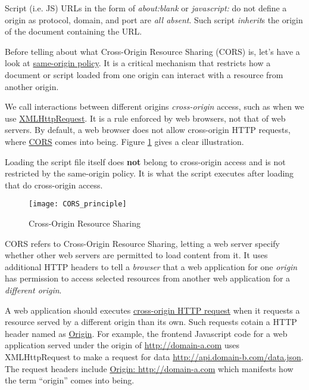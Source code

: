 Script (i.e. JS) URLs in the form of \textit{about:blank} or
\textit{javascript:} do not define a origin as protocol, domain,
and port are \textit{all absent}. Such script \textit{inherit}s
the origin of the document containing the URL.

Before telling about what Cross-Origin Resource Sharing (CORS) is,
let's have a look at
\href{https://developer.mozilla.org/en-US/docs/Web/Security/Same-origin_policy}{same-origin
  policy}. It is a critical mechanism that restricts how a
document or script loaded from one origin can interact with a
resource from another origin.

We call interactions between different origins
\textit{cross-origin} access, such as when we use
\href{https://developer.mozilla.org/en-US/docs/Web/API/XMLHttpRequest}{XMLHttpRequest}. It
is a rule enforced by web browsers, not that of web servers. By
default, a web browser does not allow cross-origin HTTP requests,
where
\href{https://developer.mozilla.org/en-US/docs/Web/HTTP/CORS}{CORS}
comes into being. Figure \ref{fig:cors} gives a clear
illustration.

Loading the script file itself does \textbf{not} belong to
cross-origin access and is not restricted by the same-origin
policy. It is what the script executes after loading that do
cross-origin access.

\begin{figure}[!htb]
  \centering
  \texttt{[image: CORS\_principle]}
  \caption{Cross-Origin Resource Sharing}
  \label{fig:cors}
\end{figure}

CORS refers to Cross-Origin Resource Sharing, letting a web server
specify whether other web servers are permitted to load content
from it. It uses additional HTTP headers to tell a
\textit{browser} that a web application for one \textit{origin}
has permission to access selected resources from another web
application for a \textit{different origin}.

A web application should executes \uline{cross-origin HTTP
  request} when it requests a resource served by a different
origin than its own. Such requests cotain a HTTP header named as
\uline{Origin}. For example, the frontend Javascript code for a
web application served under the origin of
\uline{http://domain-a.com} uses XMLHttpRequest to make a request
for data \uline{http://api.domain-b.com/data.json}. The request
headers include \uline{Origin: http://domain-a.com} which
manifests how the term ``origin'' comes into being.

